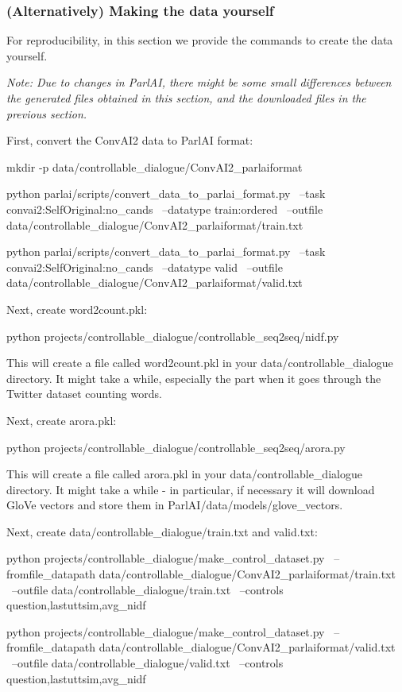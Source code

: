 \subsubsection*{(Alternatively) Making the data yourself}

For reproducibility, in this section we provide the commands to create the data yourself.

{\itshape Note\+: Due to changes in Parl\+AI, there might be some small differences between the generated files obtained in this section, and the downloaded files in the previous section.}

First, convert the Conv\+A\+I2 data to Parl\+AI format\+: \begin{DoxyVerb}mkdir -p data/controllable_dialogue/ConvAI2_parlaiformat

python parlai/scripts/convert_data_to_parlai_format.py \
--task convai2:SelfOriginal:no_cands \
--datatype train:ordered \
--outfile data/controllable_dialogue/ConvAI2_parlaiformat/train.txt

python parlai/scripts/convert_data_to_parlai_format.py \
--task convai2:SelfOriginal:no_cands \
--datatype valid \
--outfile data/controllable_dialogue/ConvAI2_parlaiformat/valid.txt
\end{DoxyVerb}


Next, create {\ttfamily word2count.\+pkl}\+: \begin{DoxyVerb}python projects/controllable_dialogue/controllable_seq2seq/nidf.py
\end{DoxyVerb}


This will create a file called {\ttfamily word2count.\+pkl} in your {\ttfamily data/controllable\+\_\+dialogue} directory. It might take a while, especially the part when it goes through the Twitter dataset counting words.

Next, create {\ttfamily arora.\+pkl}\+: \begin{DoxyVerb}python projects/controllable_dialogue/controllable_seq2seq/arora.py
\end{DoxyVerb}


This will create a file called {\ttfamily arora.\+pkl} in your {\ttfamily data/controllable\+\_\+dialogue} directory. It might take a while -\/ in particular, if necessary it will download Glo\+Ve vectors and store them in {\ttfamily Parl\+A\+I/data/models/glove\+\_\+vectors}.

Next, create {\ttfamily data/controllable\+\_\+dialogue/train.\+txt} and {\ttfamily valid.\+txt}\+: \begin{DoxyVerb}python projects/controllable_dialogue/make_control_dataset.py \
--fromfile_datapath data/controllable_dialogue/ConvAI2_parlaiformat/train.txt \
--outfile data/controllable_dialogue/train.txt \
--controls question,lastuttsim,avg_nidf

python projects/controllable_dialogue/make_control_dataset.py \
--fromfile_datapath data/controllable_dialogue/ConvAI2_parlaiformat/valid.txt \
--outfile data/controllable_dialogue/valid.txt \
--controls question,lastuttsim,avg_nidf
\end{DoxyVerb}


